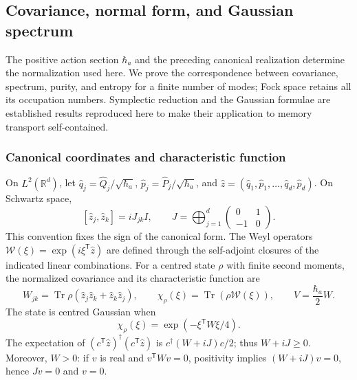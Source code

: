 \subsection{Covariance, normal form, and Gaussian spectrum}
\label{md:antmem:gauss:gaussianas-espectro}

The positive action section \(\hbar_a\) and the preceding canonical
realization determine the normalization used here. We prove the
correspondence between covariance, spectrum, purity, and entropy for a
finite number of modes; Fock space retains all its occupation numbers.
Symplectic reduction and the Gaussian formulae are established
results reproduced here to make their application to memory
transport self-contained.

\subsubsection{Canonical coordinates and characteristic function}
On \(L^2(\mathbb R^d)\), let \(\widehat q_j=\widehat Q_j/\sqrt{\hbar_a}\),
\(\widehat p_j=\widehat P_j/\sqrt{\hbar_a}\), and
\(\widehat z=(\widehat q_1,\widehat p_1,\ldots,\widehat q_d,\widehat p_d)\).
On Schwartz space,
\[
 [\widehat z_j,\widehat z_k]=iJ_{jk}I,\qquad
 J=\bigoplus_{j=1}^d\begin{pmatrix}0&1\\-1&0\end{pmatrix}.
\]
This convention fixes the sign of the canonical form. The Weyl
operators \(\mathcal W(\xi)=\exp(i\xi^{\mathsf T}\widehat z)\) are defined
through the self-adjoint closures of the indicated linear combinations.
For a centred state \(\rho\) with finite second moments, the
normalized covariance and its characteristic function are
\[
 W_{jk}=\operatorname{Tr}\rho(\widehat z_j\widehat z_k+\widehat z_k\widehat z_j),
 \qquad \chi_\rho(\xi)=\operatorname{Tr}(\rho\mathcal W(\xi)),\qquad
 V=\frac{\hbar_a}{2}W.
\]
The state is centred Gaussian when
\begin{equation}
 \chi_\rho(\xi)=\exp(-\xi^{\mathsf T}W\xi/4).
 \label{md:antmem:gauss:eq:caracteristica-gaussiana}
\end{equation}
The expectation of \((c^{\mathsf T}\widehat z)^\dagger
(c^{\mathsf T}\widehat z)\) is \(c^\dagger(W+iJ)c/2\); thus
\(W+iJ\geq0\). Moreover, \(W>0\): if \(v\) is real and
\(v^{\mathsf T}Wv=0\), positivity implies \((W+iJ)v=0\),
hence \(Jv=0\) and \(v=0\).

